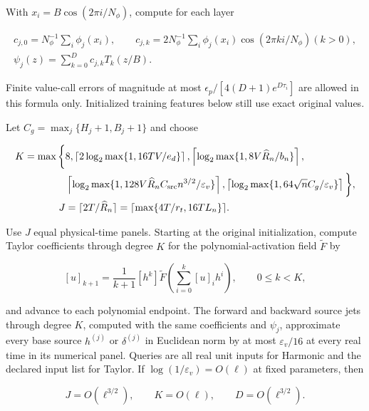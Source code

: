 With $x_i=B\cos(2\pi i/N_\phi)$, compute for each layer

\begin{equation}
\label{cp:init:eq:activation-polynomial}
\begin{gathered}
c_{j,0}=N_\phi^{-1}\sum_i\phi_j(x_i),\qquad
c_{j,k}=2N_\phi^{-1}\sum_i\phi_j(x_i)\cos(2\pi ki/N_\phi) (k>0),\\
\psi_j(z)=\sum_{k=0}^Dc_{j,k}T_k(z/B).
\end{gathered}
\end{equation}

Finite value-call errors of magnitude at most
$\epsilon_p/[4(D+1)e^{D\tau_i}]$ are allowed in this formula only.
Initialized training features below still use exact original values.

\begin{lemma}
\label{cp:init:source-routine}

Let $C_g=\max_j\{H_j+1,B_j+1\}$ and choose

\begin{equation}
\label{cp:init:eq:numerical-orders}
\begin{split}
K=\max\bigg\{&8,
 \left\lceil2\log_2\max\{1,16TV/e_d\}\right\rceil,
 \left\lceil\log_2\max\{1,8V\widehat R_n/b_n\}\right\rceil,\\
&\left\lceil\log_2\max\{1,128V\widehat R_nC_{\rm src}n^{3/2}/\varepsilon_v\}\right\rceil,
 \left\lceil\log_2\max\{1,64\sqrt nC_g/\varepsilon_v\}\right\rceil\bigg\},\\
J&=\lceil2T/\widehat R_n\rceil
 =\lceil\max\{4T/r_t,16TL_n\}\rceil.
\end{split}
\end{equation}

Use $J$ equal physical-time panels. Starting at the original initialization,
compute Taylor coefficients through degree $K$ for the polynomial-activation
field $\widetilde F$ by

\begin{equation}
\label{cp:init:eq:jet-recursion}
[u]_{k+1}=\frac1{k+1}[h^k]\widetilde F
                   \left(\sum_{i=0}^k[u]_ih^i\right),\qquad 0\le k<K,
\end{equation}

and advance to each polynomial endpoint. The forward and backward source
jets through degree $K$, computed with the same coefficients and
$\psi_j$, approximate every base source $h^{(j)}$ or
$\delta^{(j)}$ in Euclidean norm by at most $\varepsilon_v/16$
at every real time in its numerical panel. Queries are all real unit
inputs for Harmonic and the declared input list for Taylor.
If $\log(1/\varepsilon_v)=O(\ell)$ at fixed parameters, then

\begin{equation}
\label{cp:init:eq:numerical-scales}
J=O(\ell^{3/2}),\qquad K=O(\ell),\qquad D=O(\ell^{3/2}).
\end{equation}
\end{lemma}

